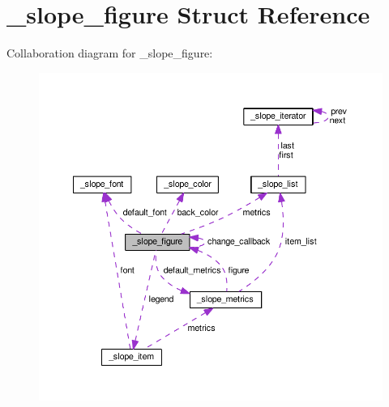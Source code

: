 \hypertarget{struct__slope__figure}{\section{\+\_\+slope\+\_\+figure Struct Reference}
\label{struct__slope__figure}
}


Collaboration diagram for \+\_\+slope\+\_\+figure\+:
\nopagebreak
\begin{figure}[H]
\begin{center}
\leavevmode
\includegraphics[width=350pt]{struct__slope__figure__coll__graph}
\end{center}
\end{figure}
